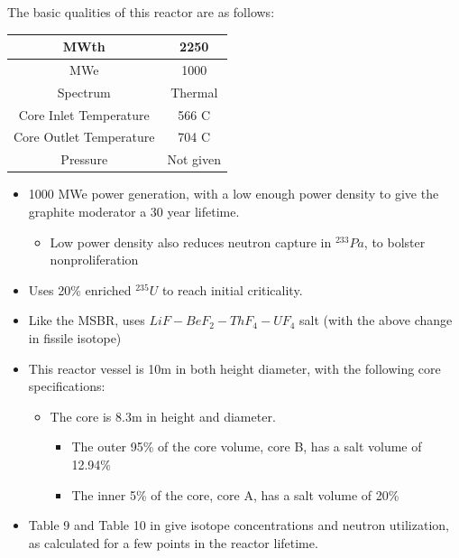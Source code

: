 \documentclass[letterpaper]{article}
\begin{document}
The basic qualities of this reactor are as follows:

\begin{center}
\begin{tabular}{|c|c|}
\hline
MWth & 2250 \\
\hline
MWe & 1000 \\
\hline
Spectrum & Thermal \\
\hline
Core Inlet Temperature & 566 C \\
\hline
Core Outlet Temperature & 704 C\\
\hline
Pressure & Not given \\
\hline
\end{tabular}
\end{center}

\begin{itemize}
\item 1000 MWe power generation, with a low enough power density to give the graphite moderator a 30 year lifetime.
	\begin{itemize}
	\item Low power density also reduces neutron capture in ${}^{233}Pa$, to bolster nonproliferation
	\end{itemize}
\item Uses 20\% enriched ${}^{235}U$ to reach initial criticality.
\item Like the MSBR, uses $LiF - BeF_2 - ThF_4 - UF_4$ salt (with the above change in fissile isotope)
\item This reactor vessel is 10m in both height diameter, with the following core specifications:
	\begin{itemize}
	\item The core is 8.3m in height and diameter.
		\begin{itemize}
		\item The outer 95\% of the core volume, core B, has a salt volume of 12.94\%
		\item The inner 5\% of the core, core A, has a salt volume of 20\%
		\end{itemize}
	\end{itemize}
\item Table 9 and Table 10 in \cite{engel_conceptual_1980} give isotope concentrations and neutron utilization, as calculated for a few points in the reactor lifetime.
\end{itemize}
\end{document}
